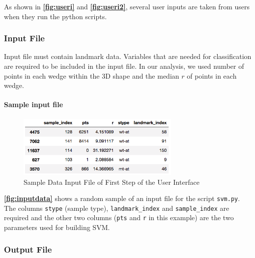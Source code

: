 \documentclass[10pt,letterpaper]{article}
\begin{document}
As shown in \textbf{\autoref{fig:useri}} and
\textbf{\autoref{fig:useri2}}, several user inputs are taken from users
when they run the python scripts.

\subsubsection{Input File}\label{input-file}

Input file must contain landmark data. Variables that are needed for
classification are required to be included in the input file. In our
analysis, we used number of points in each wedge within the 3D shape and
the median \(r\) of points in each wedge.

\paragraph{Sample input file}\label{sample-input-file}

\begin{figure}[h]

{\centering \includegraphics[width=300px]{figures/Figure3} 

}

\caption{\label{fig:inputdata} Sample Data Input File of First Step of the User Interface}\label{fig:unnamed-chunk-7}
\end{figure}

\textbf{\autoref{fig:inputdata}} shows a random sample of an input file
for the script \texttt{svm.py}. The columns \texttt{stype} (sample
type), \texttt{landmark\_index} and \texttt{sample\_index} are required
and the other two columns (\texttt{pts} and \texttt{r} in this example)
are the two parameters used for building SVM.

\subsubsection{Output File}\label{output-file}
\end{document}
